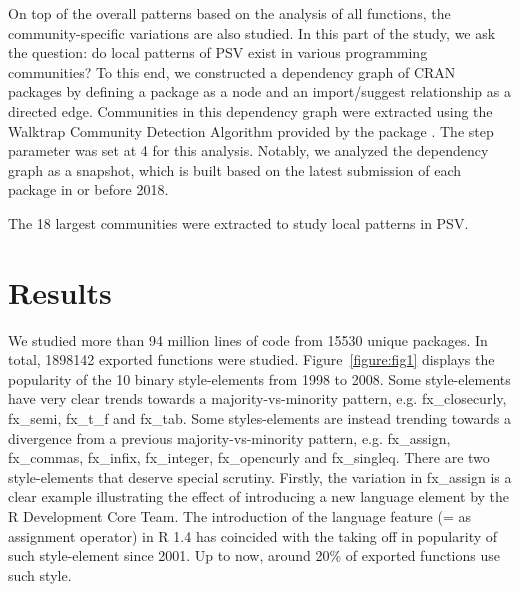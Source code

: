 On top of the overall patterns based on the analysis of all functions, the community-specific variations are also studied. In this part of the study, we ask the question: do local patterns of PSV exist in various programming communities? To this end, we constructed a dependency graph of CRAN packages by defining a package as a node and an import/suggest relationship as a directed edge. Communities in this dependency graph were extracted using the Walktrap Community Detection Algorithm \citep{pons} provided by the  package \citep{csardi}. The step parameter was set at 4 for this analysis. Notably, we analyzed the dependency graph as a snapshot, which is built based on the latest submission of each package in or before 2018.

The 18 largest communities were extracted to study local patterns in PSV.

\section{Results}

We studied more than 94 million lines of code from 15530 unique packages. In total, 1898142 exported functions were studied. Figure~\ref{figure:fig1} displays the popularity of the 10 binary style-elements from 1998 to 2008. Some style-elements have very clear trends towards a majority-vs-minority pattern, e.g. fx\_closecurly, fx\_semi, fx\_t\_f and fx\_tab. Some styles-elements are instead trending towards a divergence from a previous majority-vs-minority pattern, e.g. fx\_assign, fx\_commas, fx\_infix, fx\_integer, fx\_opencurly and fx\_singleq. There are two style-elements that deserve special scrutiny. Firstly, the variation in fx\_assign is a clear example illustrating the effect of introducing a new language element by the R Development Core Team. The introduction of the language feature (= as assignment operator) in R 1.4 \citep{chambers} has coincided with the taking off in popularity of such style-element since 2001. Up to now, around 20\% of exported functions use such style.

